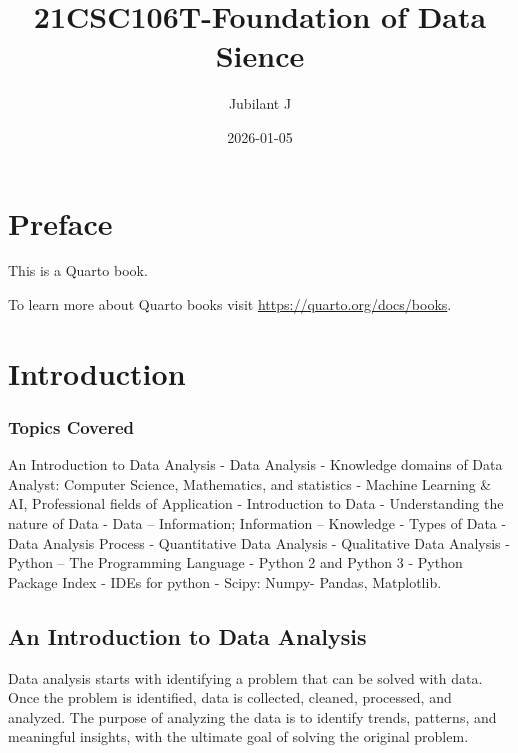\documentclass[
  letterpaper,
  DIV=11,
  numbers=noendperiod]{scrreprt}
\title{21CSC106T-Foundation of Data Sience}
\author{Jubilant J}
\date{2026-01-05}
\renewcommand*\contentsname{Table of contents}
\newcommand\contentsname{Table of contents}
\begin{document}
\maketitle

\renewcommand*\contentsname{Table of contents}
{
\setcounter{tocdepth}{2}
\tableofcontents
}


\chapter*{Preface}\label{preface}


This is a Quarto book.

To learn more about Quarto books visit
\url{https://quarto.org/docs/books}.


\chapter{Introduction}\label{introduction}

\subsection{Topics Covered}\label{topics-covered}

An Introduction to Data Analysis - Data Analysis - Knowledge domains of
Data Analyst: Computer Science, Mathematics, and statistics - Machine
Learning \& AI, Professional fields of Application - Introduction to
Data - Understanding the nature of Data - Data -- Information;
Information -- Knowledge - Types of Data - Data Analysis Process -
Quantitative Data Analysis - Qualitative Data Analysis - Python -- The
Programming Language - Python 2 and Python 3 - Python Package Index -
IDEs for python - Scipy: Numpy- Pandas, Matplotlib.

\section{An Introduction to Data
Analysis}\label{an-introduction-to-data-analysis}

Data analysis starts with identifying a problem that can be solved with
data. Once the problem is identified, data is collected, cleaned,
processed, and analyzed. The purpose of analyzing the data is to
identify trends, patterns, and meaningful insights, with the ultimate
goal of solving the original problem.
\end{document}
